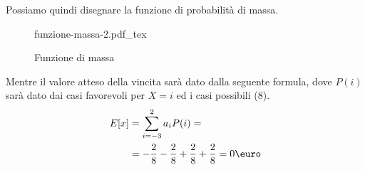 \documentclass{article}
\newcommand{\incfig}[2][1]{%
    \def\svgwidth{#1\columnwidth}
    {#2.pdf_tex}
}
\begin{document}
Possiamo quindi disegnare la funzione di probabilità di massa.
\begin{figure}[ht]
    \centering
    \incfig[0.6]{funzione-massa-2}
    \caption{Funzione di massa}
    \label{fig:funzione-massa-2}
\end{figure}

Mentre il valore atteso della vincita sarà dato dalla seguente formula, dove
$P(i)$ sarà dato dai casi favorevoli per $X=i$ ed i casi possibili ($8$).
\[
  \begin{split}
  E[x]&= \sum^{2}_{i=-3} a_i P(i)=\\
  &= -\frac{2}{8}-\frac{2}{8}+\frac{2}{8}+\frac{2}{8}=0\text{\euro}
  \end{split}
\]
\end{document}
